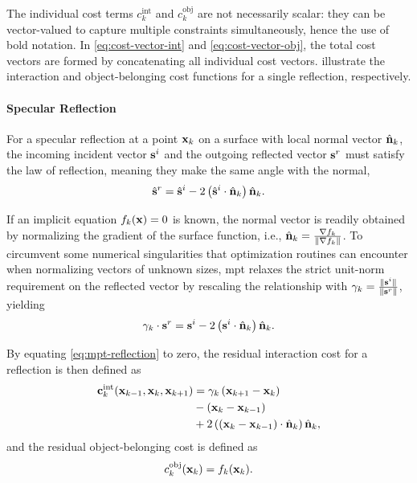 The individual cost terms $c_k^{\mathrm{int}}$ and $c_k^{\mathrm{obj}}$ are not necessarily scalar: they can be vector-valued to capture multiple constraints simultaneously, hence the use of bold notation. In \eqref{eq:cost-vector-int} and \eqref{eq:cost-vector-obj}, the total cost vectors are formed by concatenating all individual cost vectors.  illustrate the interaction and object-belonging cost functions for a single reflection, respectively.

\paragraph{Specular Reflection}

For a specular reflection at a point $\mathbf{x}_k$ on a surface with local normal vector $\hat{\mathbf{n}}_k$, the incoming incident vector $\mathbf{s}^i$ and the outgoing reflected vector $\mathbf{s}^r$ must satisfy the law of reflection, meaning they make the same angle with the normal,
\begin{equation}
  \hat{\mathbf{s}}^r = \hat{\mathbf{s}}^i - 2 \left(\hat{\mathbf{s}}^i \cdot \hat{\mathbf{n}}_k\right)\hat{\mathbf{n}}_k.
\end{equation}

If an implicit equation $f_k(\mathbf{x})=0$ is known, the normal vector is readily obtained by normalizing the gradient of the surface function, i.e., $\hat{\mathbf{n}}_k = \tfrac{\nabla f_k}{\|\nabla f_k\|}$. To circumvent some numerical singularities that optimization routines can encounter when normalizing vectors of unknown sizes, \gls{mpt} relaxes the strict unit-norm requirement on the reflected vector by rescaling the relationship with $\gamma_k = \tfrac{\|\mathbf{s}^i\|}{\|\mathbf{s}^r\|}$, yielding
\begin{equation}\label{eq:mpt-reflection}
  \gamma_k \cdot \mathbf{s}^r = \mathbf{s}^i - 2 \left(\mathbf{s}^i \cdot \hat{\mathbf{n}}_k\right)\hat{\mathbf{n}}_k.
\end{equation}

By equating \eqref{eq:mpt-reflection} to zero, the residual interaction cost for a reflection is then defined as
\begin{equation}
  \begin{split}
    \mathbf{c}_k^{\mathrm{int}}(\mathbf{x}_{k-1}, \mathbf{x}_k, \mathbf{x}_{k+1}) &= \gamma_k \left(\mathbf{x}_{k+1} - \mathbf{x}_k\right)\\
    &-\left(\mathbf{x}_k - \mathbf{x}_{k-1}\right)\\
    &+ 2 \left(\left(\mathbf{x}_k - \mathbf{x}_{k-1}\right) \cdot \hat{\mathbf{n}}_k\right)\hat{\mathbf{n}}_k,
  \end{split}
\end{equation}
and the residual object-belonging cost is defined as
\begin{equation}
  c_k^{\mathrm{obj}}(\mathbf{x}_k) = f_k(\mathbf{x}_k).
\end{equation}

